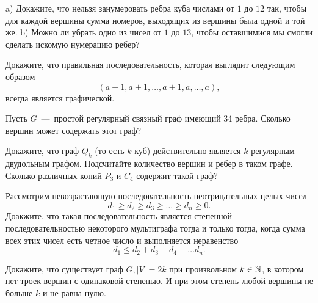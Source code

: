 \begin{exersize}
	a) Докажите, что нельзя занумеровать ребра куба числами от $1$ до $12$ так, чтобы для каждой вершины сумма номеров, 
	выходящих из вершины была одной и той же. b) Можно ли убрать одно из чисел от $1$ до $13$, 
	чтобы оставшимися мы смогли сделать искомую нумерацию ребер?
\end{exersize}

\begin{exersize}
	Докажите, что правильная последовательность, которая выглядит следующим образом
	$$(a+1, a+1, \dots, a+1, a, \dots, a),$$
	всегда является графической.
\end{exersize}

\begin{exersize}
	Пусть $G$~---~простой регулярный связный граф имеющий 34 ребра. Сколько вершин может содержать этот граф?
\end{exersize}

\begin{exersize}
	Докажите, что граф $Q_k$ (то есть $k$-куб) действительно является $k$-регулярным двудольным графом.
	Подсчитайте количество вершин и ребер в таком графе. Сколько различных копий $P_3$ и $C_4$ содержит такой граф?
\end{exersize}

\begin{exersize}
	Рассмотрим невозрастающую последовательность неотрицательных целых чисел
	$$d_1 \geqslant d_2 \geqslant d_3 \geqslant \dots \geqslant d_n \geqslant 0.$$
	Доакжите, что такая последовательность является степенной последовательностью некоторого мультиграфа
	тогда и только тогда, когда сумма всех этих чисел есть четное число и выполняется неравенство
	$$d_1 \leqslant d_2 + d_3 + d_4 + \dots d_n.$$
\end{exersize}

\begin{exersize}
	Докажите, что существует граф $G, |V| = 2k$ при произвольном $k \in \mathbb{N}$, в котором нет троек вершин с одинаковой степенью. 
	И при этом степень любой вершины не больше $k$ и не равна нулю.
\end{exersize}
